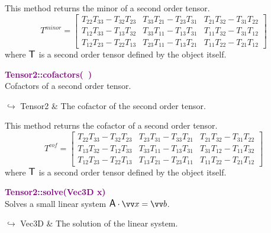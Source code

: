 This method returns the minor of a second order tensor.
\begin{equation*}
T^{minor} = \left[\begin{array}{ccc}
T_{22}T_{33}-T_{32}T_{23} & T_{33}T_{21}-T_{23}T_{31} & T_{21}T_{32}-T_{31}T_{22}\\
T_{12}T_{33}-T_{13}T_{32} & T_{33}T_{11}-T_{13}T_{31} & T_{11}T_{32}-T_{31}T_{12}\\
T_{12}T_{23}-T_{22}T_{13} & T_{23}T_{11}-T_{13}T_{21} & T_{11}T_{22}-T_{21}T_{12}
\end{array}
\right]
\end{equation*}
where $\mbox{\large\ensuremath{\mathsf{T}}}$ is a second order tensor defined by the object itself.

\textcolor{purple}{\textbf{Tensor2::cofactors(~)}}\label{Tensor2::cofactors()}\\
Cofactors of a second order tensor.\vspace*{-0.5em}
\begin{tcolorbox}[grow to left by=-1cm, width=\textwidth-1cm,myArgs,tabularx={l|R}]
$\hookrightarrow$ Tensor2 & The cofactor of the second order tensor.
\end{tcolorbox}

This method returns the cofactor of a second order tensor.
\begin{equation*}
T^{cof} = \left[\begin{array}{ccc}
T_{22}T_{33}-T_{32}T_{23} & T_{23}T_{31}-T_{33}T_{21} & T_{21}T_{32}-T_{31}T_{22}\\
T_{13}T_{32}-T_{12}T_{33} & T_{33}T_{11}-T_{13}T_{31} & T_{31}T_{12}-T_{11}T_{32}\\
T_{12}T_{23}-T_{22}T_{13} & T_{13}T_{21}-T_{23}T_{11} & T_{11}T_{22}-T_{21}T_{12}
\end{array}
\right]
\end{equation*}
where $\mbox{\large\ensuremath{\mathsf{T}}}$ is a second order tensor defined by the object itself.

\textcolor{purple}{\textbf{Tensor2::solve(Vec3D x)}}\label{Tensor2::solve(Vec3D x)}\\
Solves a small linear system $\A\cdot \overrightarrow{x} = \overrightarrow{b}$.\vspace*{-0.5em}
\begin{tcolorbox}[grow to left by=-1cm, width=\textwidth-1cm,myArgs,tabularx={l|R}]
$\hookrightarrow$ Vec3D & The solution of the linear system.
\end{tcolorbox}

